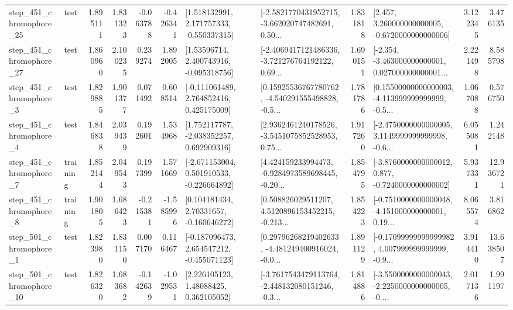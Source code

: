 \begin{tabular}{llrrrrllrlrr}
  step\_451\_chromophore\_25 &      test &      1.895111 &    1.831323 &     -0.063788 & -0.426341 &    [1.518132991, 2.171757333, -0.550337315] &  [-2.5821770431952715, -3.662020747482691, 0.50... &       1.831818 &    [2.457, 3.260000000000005, -0.6720000000000006] &            3.122345 &          3.476135 \\
  step\_451\_chromophore\_27 &      test &      1.860960 &    2.100235 &      0.239274 &  1.892005 &     [1.53596714, 2.400743916, -0.095318756] &  [-2.4069417121486336, -3.721276764192122, 0.69... &       1.690151 &  [-2.354, -3.463000000000001, 0.027000000000001... &            2.221498 &          8.585798 \\
   step\_451\_chromophore\_3 &      test &      1.829885 &    1.901377 &      0.071492 &  0.608514 &    [-0.111061489, 2.764852416, 0.425175009] &  [0.15925536767780762, -4.540291555498828, -0.5... &       1.781786 &  [0.15500000000000003, -4.113999999999999, -0.5... &            1.067088 &          0.576750 \\
   step\_451\_chromophore\_4 &      test &      1.846838 &    2.039439 &      0.192601 &  1.534968 &    [1.752117787, -2.038352257, 0.692909316] &  [2.9362461240178526, -3.5451075852528953, 0.75... &       1.917260 &  [-2.4750000000000005, 3.1149999999999998, -0.6... &            6.055081 &          1.242148 \\
   step\_451\_chromophore\_7 &  training &      1.852144 &    2.049543 &      0.197399 &  1.571669 &   [-2.671153004, 0.501910533, -0.226664892] &  [4.424159233994473, -0.9284973589698445, -0.20... &       1.854795 &  [-3.8760000000000012, 0.877, -0.7240000000000002] &            5.937331 &         12.936721 \\
   step\_451\_chromophore\_8 &  training &      1.901805 &    1.686423 &     -0.215381 & -1.585996 &     [0.104181434, 2.70331657, -0.160646272] &  [0.508826029511207, 4.5120896153452215, -0.213... &       1.854223 &  [-0.7510000000000048, -4.151000000000001, 0.19... &            8.065574 &          3.816862 \\
   step\_501\_chromophore\_1 &      test &      1.823980 &    1.831150 &      0.007170 &  0.116467 &   [-0.187096473, 2.654547212, -0.455071123] &  [0.29796268219402633, -4.481249400916024, -0.0... &       1.891129 &  [-0.17099999999999982, 4.007999999999999, -0.9... &            3.914410 &         13.638507 \\
  step\_501\_chromophore\_10 &      test &      1.826320 &    1.683682 &     -0.142639 & -1.029531 &      [2.226105123, 1.48088425, 0.362105052] &  [-3.7617543479113764, -2.448132080151246, -0.3... &       1.814886 &  [-3.5500000000000043, -2.2250000000000005, -0.... &            2.017136 &          1.991197 \\

\end{tabular}
